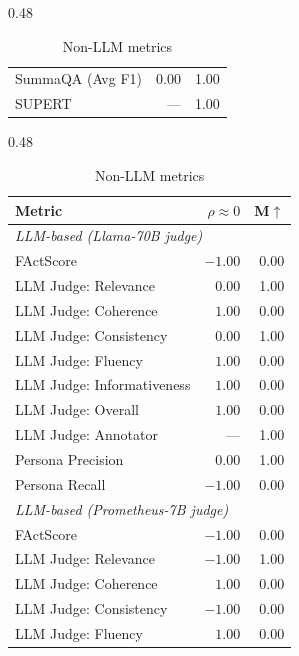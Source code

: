 \begin{table}[htbp]
\begin{subtable}[t]{0.48\textwidth}
\begin{tabular}{lrr}
\rowcolor{matchTrue} SummaQA (Avg F1)                      &   $0.00$ &  1.00 \\
\rowcolor{matchTrue} SUPERT                                &      --- &  1.00 \\
\bottomrule
\end{tabular}
\caption{Non-LLM metrics}
\end{subtable}
\hfill
\begin{subtable}[t]{0.48\textwidth}
\centering
\begin{tabular}{lrr}
\toprule
Metric & $\rho\approx0$ & M$\uparrow$\\
\midrule
\multicolumn{3}{l}{\textit{LLM-based (Llama-70B judge)}} \\
\midrule
\rowcolor{matchFalse} FActScore                             &  $-1.00$ &  0.00 \\
\rowcolor{matchTrue} LLM Judge: Relevance                  &   $0.00$ &  1.00 \\
\rowcolor{matchFalse} LLM Judge: Coherence                  &   $1.00$ &  0.00 \\
\rowcolor{matchTrue} LLM Judge: Consistency                &   $0.00$ &  1.00 \\
\rowcolor{matchFalse} LLM Judge: Fluency                    &   $1.00$ &  0.00 \\
\rowcolor{matchFalse} LLM Judge: Informativeness            &   $1.00$ &  0.00 \\
\rowcolor{matchFalse} LLM Judge: Overall                    &   $1.00$ &  0.00 \\
\rowcolor{matchTrue} LLM Judge: Annotator        &      --- &  1.00 \\
\rowcolor{matchTrue} Persona Precision                     &   $0.00$ &  1.00 \\
\rowcolor{matchFalse} Persona Recall                        &  $-1.00$ &  0.00 \\
\midrule
\multicolumn{3}{l}{\textit{LLM-based (Prometheus-7B judge)}} \\
\midrule
\rowcolor{matchFalse} FActScore                             &  $-1.00$ &  0.00 \\
\rowcolor{matchFalse} LLM Judge: Relevance                  &  $-1.00$ &  1.00 \\
\rowcolor{matchFalse} LLM Judge: Coherence                  &   $1.00$ &  0.00 \\
\rowcolor{matchFalse} LLM Judge: Consistency                &  $-1.00$ &  0.00 \\
\rowcolor{matchFalse} LLM Judge: Fluency                    &   $1.00$ &  0.00 \\

\end{tabular}
\end{subtable}
\end{table}
